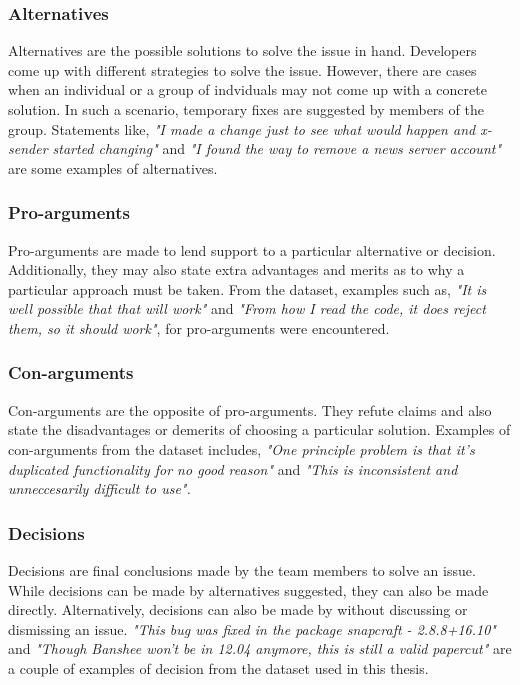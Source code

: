 \documentclass[a4paper,12pt,twoside]{report}
\begin{document}
\subsubsection{Alternatives}
Alternatives are the possible solutions to solve the issue in hand. Developers come up with different strategies to solve the issue. However, there are cases when an individual or a group of indviduals may not come up with a concrete solution. In such a scenario, temporary fixes are suggested by members of the group. Statements like, \textit{"I made a change just to see what would happen and x-sender started changing"} and \textit{"I found the way to remove a news server account"} are some examples of alternatives.

\subsubsection{Pro-arguments}
Pro-arguments are made to lend support to a particular alternative or decision. Additionally, they may also state extra advantages and merits as to why a particular approach must be taken. From the dataset, examples such as, \textit{"It is well possible that that will work"} and \textit{"From how I read the code, it does reject them, so it should work"}, for pro-arguments were encountered. 

\subsubsection{Con-arguments}
Con-arguments are the opposite of pro-arguments. They refute claims and also state the disadvantages or demerits of choosing a particular solution. Examples of con-arguments from the dataset includes, \textit{"One principle problem is that it's duplicated functionality for no good reason"} and \textit{"This is inconsistent and unneccesarily difficult to use".}

\subsubsection{Decisions}
Decisions are final conclusions made by the team members to solve an issue. While decisions can be made by alternatives suggested, they can also be made directly. Alternatively, decisions can also be made by without discussing or dismissing an issue. \textit{"This bug was fixed in the package snapcraft - 2.8.8+16.10"} and \textit{"Though Banshee won't be in 12.04 anymore, this is still a valid papercut"} are a couple of examples of decision from the dataset used in this thesis.
\end{document}
